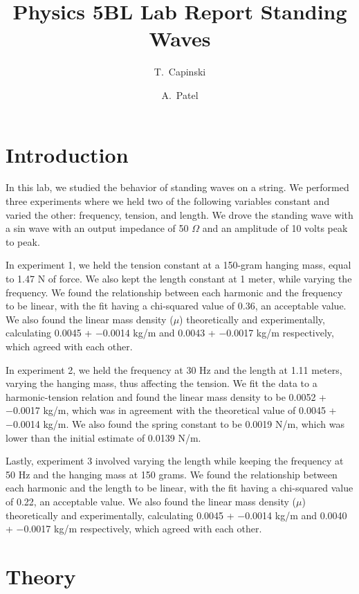 \documentclass[11pt]{article}
\title{Physics 5BL Lab Report Standing Waves}
\author{T.~Capinski \and A.~Patel}
\let\oldsection\section
\renewcommand\section{\clearpage\oldsection}
\begin{document}
    \maketitle
    \tableofcontents

    \section*{Introduction}\label{sec:introduction}
    In this lab, we studied the behavior of standing waves on a string.
    We performed three experiments where we held two of the following variables constant and varied the other: frequency, tension, and length.
    We drove the standing wave with a sin wave with an output impedance of 50 $\Omega$ and an amplitude of 10 volts peak to peak.

    In experiment 1, we held the tension constant at a 150-gram hanging mass, equal to 1.47 N of force.
    We also kept the length constant at 1 meter, while varying the frequency.
    We found the relationship between each harmonic and the frequency to be linear, with the fit having a chi-squared value of 0.36, an acceptable value.
    We also found the linear mass density ($\mu$) theoretically and experimentally, calculating 0.0045 + −0.0014 kg/m and 0.0043 + −0.0017 kg/m respectively, which agreed with each other.

    In experiment 2, we held the frequency at 30 Hz and the length at 1.11 meters, varying the hanging mass, thus affecting the tension.
    We fit the data to a harmonic-tension relation and found the linear mass density to be 0.0052 + −0.0017 kg/m, which was in agreement with the theoretical value of 0.0045 + −0.0014 kg/m.
    We also found the spring constant to be 0.0019 N/m, which was lower than the initial estimate of 0.0139 N/m.

    Lastly, experiment 3 involved varying the length while keeping the frequency at 50 Hz and the hanging mass at 150 grams.
    We found the relationship between each harmonic and the length to be linear, with the fit having a chi-squared value of 0.22, an acceptable value.
    We also found the linear mass density ($\mu$) theoretically and experimentally, calculating 0.0045 + −0.0014 kg/m and 0.0040 + −0.0017 kg/m respectively, which agreed with each other.

    
    \section*{Theory}\label{sec:theory}
\end{document}
